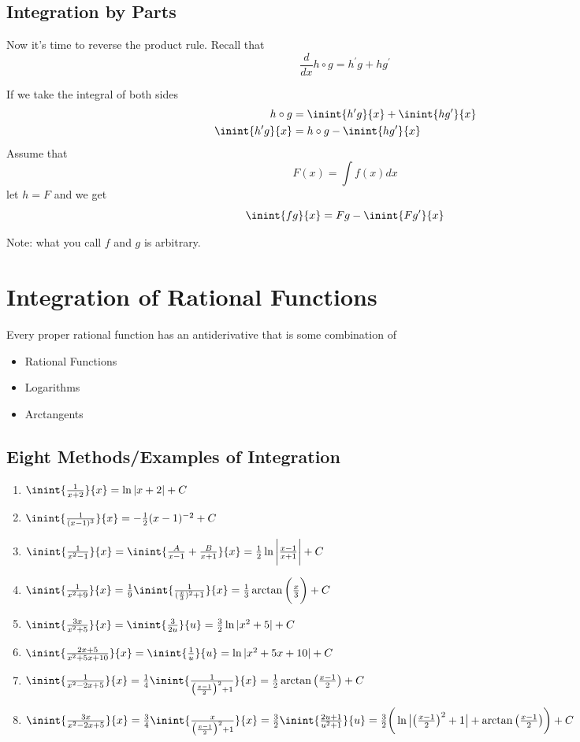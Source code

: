 \documentclass[12pt]{article}
\begin{document}
\subsection*{Integration by Parts}
Now it's time to reverse the product rule. Recall that \[ \frac{d}{dx} h\circ g = h^\prime g + hg^\prime \]

If we take the integral of both sides
\begin{align*}
h\circ g &= \inint{h^\prime g}{x} + \inint{hg^\prime}{x}\\
\inint{h^\prime g}{x} &= h\circ g - \inint{hg^\prime}{x}
\end{align*}
Assume that \[ F(x) = \int\! f(x)dx \] let $h = F$ and we get \[ \inint{fg}{x} = Fg - \inint{Fg^\prime}{x} \]

Note: what you call $f$ and $g$ is arbitrary.

\section*{Integration of Rational Functions}
Every proper rational function has an antiderivative that is some combination of
\begin{itemize}
\item Rational Functions
\item Logarithms
\item Arctangents
\end{itemize}

\subsection*{Eight Methods/Examples of Integration}
\begin{enumerate}
\item $\inint{\frac{1}{x+2}}{x} = \ln|x+2| + C$
\item $\inint{\frac{1}{(x-1)^3}}{x} = -\half (x-1)^{-2} + C$
\item $\inint{\frac{1}{x^2-1}}{x} = \inint{\frac{A}{x-1}+\frac{B}{x+1}}{x} = \half \ln\bigg|\frac{x-1}{x+1}\bigg| + C$
\item $\inint{\frac{1}{x^2+9}}{x} = \frac{1}{9}\inint{\frac{1}{(\frac{x}{3})^2+1}}{x} = \frac{1}{3}\arctan\bigg(\frac{x}{3}\bigg) + C$
\item $\inint{\frac{3x}{x^2+5}}{x} = \inint{\frac{3}{2u}}{u} = \frac{3}{2}\ln|x^2+5| + C$
\item $\inint{\frac{2x+5}{x^2+5x+10}}{x} = \inint{\frac{1}{u}}{u} = \ln|x^2+5x+10| + C$
\item $\inint{\frac{1}{x^2-2x+5}}{x} = \quarter \inint{\frac{1}{\big(\frac{x-1}{2}\big)^2+1}}{x} = \half \arctan\big(\frac{x-1}{2}\big) + C$
\item $\inint{\frac{3x}{x^2-2x+5}}{x} = \frac{3}{4}\inint{\frac{x}{\big(\frac{x-1}{2}\big)^2+1}}{x} = \frac{3}{2}\inint{\frac{2u+1}{u^2+1}}{u} = \frac{3}{2}\bigg(\ln\big|\big(\frac{x-1}{2}\big)^2 + 1\big| + \arctan\big(\frac{x-1}{2}\big)\bigg) + C$
\end{enumerate}
\end{document}
